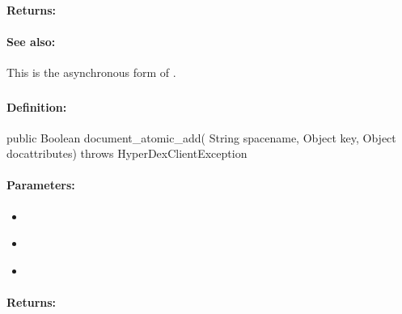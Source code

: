 \paragraph{Returns:}


\paragraph{See also:}  This is the asynchronous form of .

\pagebreak
\subsubsection{}
\label{api:java:document_atomic_add}


\paragraph{Definition:}
\begin{javacode}
public Boolean document_atomic_add(
        String spacename,
        Object key,
        Object docattributes) throws HyperDexClientException
\end{javacode}

\paragraph{Parameters:}
\begin{itemize}[noitemsep]
\item {}\\

\item {}\\

\item {}\\

\end{itemize}

\paragraph{Returns:}


